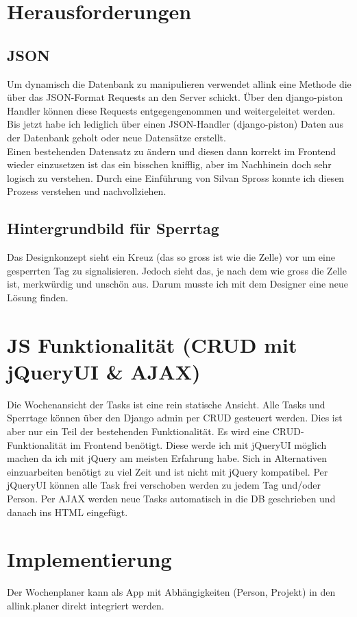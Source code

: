 \section{Herausforderungen}
\subsection{JSON}
Um dynamisch die Datenbank zu manipulieren verwendet allink eine Methode die über das JSON-Format Requests an den Server schickt. 
Über den django-piston Handler können diese Requests entgegengenommen und weitergeleitet werden.\\
Bis jetzt habe ich lediglich über einen JSON-Handler (django-piston) Daten aus der Datenbank geholt oder neue Datensätze erstellt.\\
Einen bestehenden Datensatz zu ändern und diesen dann korrekt im Frontend wieder einzusetzen ist das ein bisschen knifflig, aber im Nachhinein doch sehr logisch zu verstehen.
Durch eine Einführung von Silvan Spross konnte ich diesen Prozess verstehen und nachvollziehen.
\subsection{Hintergrundbild für Sperrtag}
Das Designkonzept sieht ein Kreuz (das so gross ist wie die Zelle) vor um eine gesperrten Tag zu signalisieren.
Jedoch sieht das, je nach dem wie gross die Zelle ist, merkwürdig und unschön aus. 
Darum musste ich mit dem Designer eine neue Lösung finden.
\section{JS Funktionalität (CRUD mit jQueryUI \& AJAX) }
Die Wochenansicht der Tasks ist eine rein statische Ansicht.
Alle Tasks und Sperrtage können über den Django admin per CRUD gesteuert werden. Dies ist aber nur ein Teil der bestehenden Funktionalität.
Es wird eine CRUD-Funktionalität im Frontend benötigt. Diese werde ich mit jQueryUI möglich machen da ich mit jQuery am meisten Erfahrung habe.
Sich in Alternativen einzuarbeiten benötigt zu viel Zeit und ist nicht mit jQuery kompatibel.
Per jQueryUI können alle Task frei verschoben werden zu jedem Tag und/oder Person.
Per AJAX werden neue Tasks automatisch in die DB geschrieben und danach ins HTML eingefügt.
\section{Implementierung}
Der Wochenplaner kann als App mit Abhängigkeiten (Person, Projekt) in den allink.planer direkt integriert werden.
